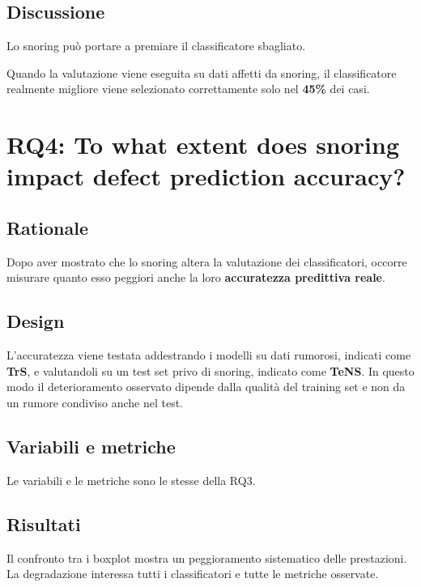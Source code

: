 \subsection{Discussione}

Lo snoring può portare a premiare il classificatore sbagliato.

\begin{notaslide}
Quando la valutazione viene eseguita su dati affetti da snoring, il classificatore realmente migliore viene selezionato correttamente solo nel \textbf{45\%} dei casi.
\end{notaslide}

\section{RQ4: To what extent does snoring impact defect prediction accuracy?}

\subsection{Rationale}

Dopo aver mostrato che lo snoring altera la valutazione dei classificatori, occorre misurare quanto esso peggiori anche la loro \textbf{accuratezza predittiva reale}.

\subsection{Design}

L'accuratezza viene testata addestrando i modelli su dati rumorosi, indicati come \textbf{TrS}, e valutandoli su un test set privo di snoring, indicato come \textbf{TeNS}. In questo modo il deterioramento osservato dipende dalla qualità del training set e non da un rumore condiviso anche nel test.

\subsection{Variabili e metriche}

Le variabili e le metriche sono le stesse della RQ3.

\subsection{Risultati}

Il confronto tra i boxplot mostra un peggioramento sistematico delle prestazioni. La degradazione interessa tutti i classificatori e tutte le metriche osservate.

